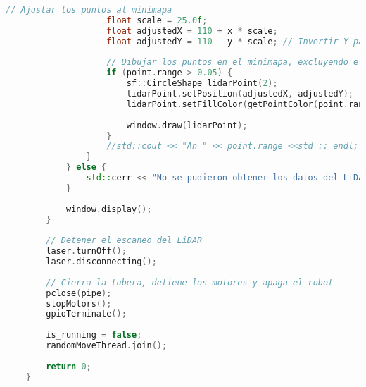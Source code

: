 \begin{lstlisting}[language={C++}, caption={Primer ajuste de c\'odigo}, label={Script}]
                    // Ajustar los puntos al minimapa
                    float scale = 25.0f;
                    float adjustedX = 110 + x * scale;
                    float adjustedY = 110 - y * scale; // Invertir Y para coordinar con la pantalla
    
                    // Dibujar los puntos en el minimapa, excluyendo el centro (0,0)
                    if (point.range > 0.05) {
                        sf::CircleShape lidarPoint(2);
                        lidarPoint.setPosition(adjustedX, adjustedY);
                        lidarPoint.setFillColor(getPointColor(point.range, max_range));
    
                        window.draw(lidarPoint);
                    }
                    //std::cout << "An " << point.range <<std :: endl;
                }
            } else {
                std::cerr << "No se pudieron obtener los datos del LiDAR." << std::endl;
            }
    
            window.display();
        }
    
        // Detener el escaneo del LiDAR
        laser.turnOff();
        laser.disconnecting();
    
        // Cierra la tubera, detiene los motores y apaga el robot
        pclose(pipe);
        stopMotors();
        gpioTerminate();
    
        is_running = false;
        randomMoveThread.join();
    
        return 0;
    }
\end{lstlisting}
